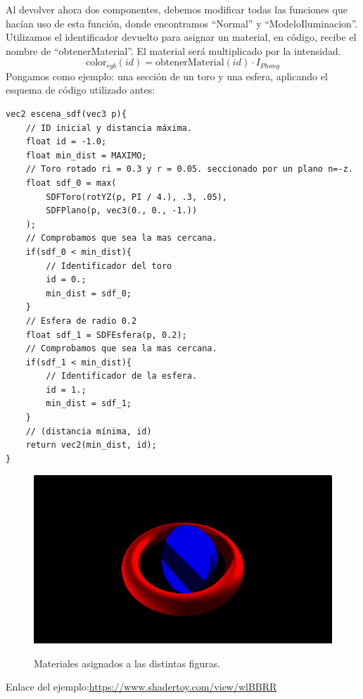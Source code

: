 Al devolver ahora dos componentes, debemos modificar todas las funciones que hacían uso de esta función, donde encontramos \enquote{Normal} y \enquote{ModeloIluminacion}. Utilizamos el identificador devuelto para asignar un material, en código, recibe el nombre de \enquote{obtenerMaterial}. El material será multiplicado por la intensidad.
\[ \text{color}_{rgb}(id) = \text{obtenerMaterial}(id) \cdot I_{Phong} \]
Pongamos como ejemplo: una sección de un toro y una esfera, aplicando el esquema de código utilizado antes:

\begin{lstlisting}
vec2 escena_sdf(vec3 p){
    // ID inicial y distancia máxima.
    float id = -1.0;
    float min_dist = MAXIMO;
    // Toro rotado ri = 0.3 y r = 0.05. seccionado por un plano n=-z.
    float sdf_0 = max(
        SDFToro(rotYZ(p, PI / 4.), .3, .05),
        SDFPlano(p, vec3(0., 0., -1.))
    );
    // Comprobamos que sea la mas cercana.
    if(sdf_0 < min_dist){
        // Identificador del toro
        id = 0.;
        min_dist = sdf_0;
    }
    // Esfera de radio 0.2
    float sdf_1 = SDFEsfera(p, 0.2);
    // Comprobamos que sea la mas cercana.
    if(sdf_1 < min_dist){
        // Identificador de la esfera.
        id = 1.;
        min_dist = sdf_1;
    }
    // (distancia mínima, id)
    return vec2(min_dist, id);
}
\end{lstlisting}

\begin{figure}[H]
  \centering
  \captionsetup{justification=centering}%
  \includegraphics[width=1.0\textwidth]{secciones/imagenes/material/materiales.png}\label{fig:material}
  \caption{Materiales asignados a las distintas figuras.}
\end{figure}

Enlace del ejemplo:\url{https://www.shadertoy.com/view/wlBBRR}

